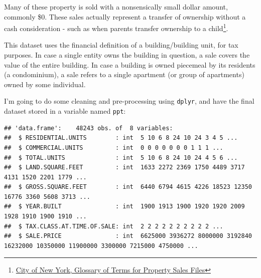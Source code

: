 \documentclass[]{article}
\newenvironment{Shaded}{\begin{snugshade}}{\end{snugshade}}
\newcommand{\DataTypeTok}[1]{\textcolor[rgb]{0.13,0.29,0.53}{#1}}
\newcommand{\KeywordTok}[1]{\textcolor[rgb]{0.13,0.29,0.53}{\textbf{#1}}}
\newcommand{\NormalTok}[1]{#1}
\newcommand{\OperatorTok}[1]{\textcolor[rgb]{0.81,0.36,0.00}{\textbf{#1}}}
\newcommand{\StringTok}[1]{\textcolor[rgb]{0.31,0.60,0.02}{#1}}
\let\rmarkdownfootnote\footnote%
\def\footnote{\protect\rmarkdownfootnote}
\begin{document}
Many of these property is sold with a nonsensically small dollar amount,
commonly \$0. These sales actually represent a transfer of ownership
without a cash consideration - such as when parents transfer ownership
to a child\footnote{\href{http://www1.nyc.gov/assets/finance/downloads/pdf/07pdf/glossary_rsf071607.pdf}{City
  of New York, Glossary of Terms for Property Sales Files}}.

This dataset uses the financial definition of a building/building unit,
for tax purposes. In case a single entity owns the building in question,
a sale covers the value of the entire building. In case a building is
owned piecemeal by its residents (a condominium), a sale refers to a
single apartment (or group of apartments) owned by some individual.

I'm going to do some cleaning and pre-processing using \texttt{dplyr},
and have the final dataset stored in a variable named \texttt{ppt}:

\begin{Shaded}
\end{Shaded}

\begin{verbatim}
## 'data.frame':    48243 obs. of  8 variables:
##  $ RESIDENTIAL.UNITS        : int  5 10 6 8 24 10 24 3 4 5 ...
##  $ COMMERCIAL.UNITS         : int  0 0 0 0 0 0 0 1 1 1 ...
##  $ TOTAL.UNITS              : int  5 10 6 8 24 10 24 4 5 6 ...
##  $ LAND.SQUARE.FEET         : int  1633 2272 2369 1750 4489 3717 4131 1520 2201 1779 ...
##  $ GROSS.SQUARE.FEET        : int  6440 6794 4615 4226 18523 12350 16776 3360 5608 3713 ...
##  $ YEAR.BUILT               : int  1900 1913 1900 1920 1920 2009 1928 1910 1900 1910 ...
##  $ TAX.CLASS.AT.TIME.OF.SALE: int  2 2 2 2 2 2 2 2 2 2 ...
##  $ SALE.PRICE               : int  6625000 3936272 8000000 3192840 16232000 10350000 11900000 3300000 7215000 4750000 ...
\end{verbatim}
\end{document}

